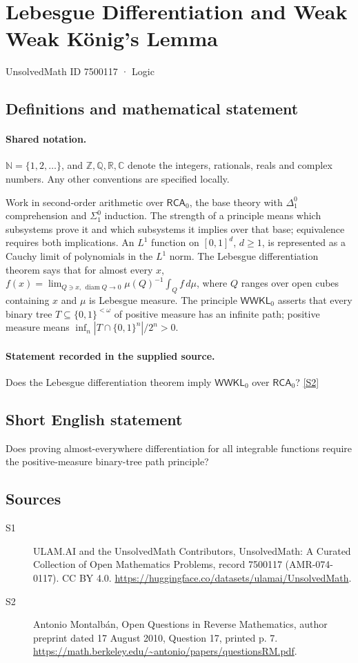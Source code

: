 \documentclass[11pt]{article}
\newcommand{\sref}[2]{\hyperlink{source:#1:#2}{[S#2]}}
\begin{document}
\setcounter{section}{7500116}
\section{Lebesgue Differentiation and Weak Weak König's Lemma}\label{7500117}
{\small\sffamily UnsolvedMath ID 7500117 · Logic}
\subsection{Definitions and mathematical statement}

\paragraph{Shared notation.}$\mathbb N=\{1,2,\ldots\}$, and $\mathbb Z,\mathbb Q,\mathbb R,\mathbb C$ denote the integers, rationals, reals and complex numbers. Any other conventions are specified locally.


Work in second-order arithmetic over $\mathsf{RCA}_0$, the base theory with $\Delta^0_1$ comprehension and $\Sigma^0_1$ induction. The strength of a principle means which subsystems prove it and which subsystems it implies over that base; equivalence requires both implications. An $L^1$ function on $[0,1]^d$, $d\geq1$, is represented as a Cauchy limit of polynomials in the $L^1$ norm. The Lebesgue differentiation theorem says that for almost every $x$, $f(x)=\lim_{Q\ni x,\,\operatorname{diam}Q\to0}\mu(Q)^{-1}\int_Qf\,d\mu$, where $Q$ ranges over open cubes containing $x$ and $\mu$ is Lebesgue measure. The principle $\mathsf{WWKL}_0$ asserts that every binary tree $T\subseteq\{0,1\}^{<\omega}$ of positive measure has an infinite path; positive measure means $\inf_n |T\cap\{0,1\}^n|/2^n>0$.
\paragraph{Statement recorded in the supplied source.}
Does the Lebesgue differentiation theorem imply $\mathsf{WWKL}_0$ over $\mathsf{RCA}_0$? \sref{7500117}{2}
\subsection{Short English statement}
Does proving almost-everywhere differentiation for all integrable functions require the positive-measure binary-tree path principle?
\subsection{Sources}
\begin{description}
\item[\hypertarget{source:7500117:1}{S1}] ULAM.AI and the UnsolvedMath Contributors, UnsolvedMath: A Curated Collection of Open Mathematics Problems, record 7500117 (AMR-074-0117). CC BY 4.0. \url{https://huggingface.co/datasets/ulamai/UnsolvedMath}.
\item[\hypertarget{source:7500117:2}{S2}] Antonio Montalbán, Open Questions in Reverse Mathematics, author preprint dated 17 August 2010, Question 17, printed p. 7. \url{https://math.berkeley.edu/~antonio/papers/questionsRM.pdf}.
\end{description}
\label{end:7500117}
\end{document}
